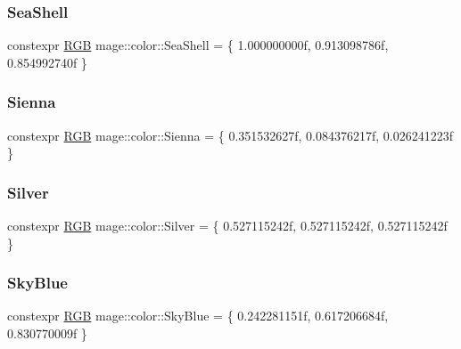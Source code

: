 \mbox{\label{namespacemage_1_1color_aa47be4b4b7553ee872d5593ce4312249}} 
\subsubsection{\texorpdfstring{Sea\+Shell}{SeaShell}}
{\footnotesize\ttfamily constexpr \mbox{\hyperlink{structmage_1_1_r_g_b}{R\+GB}} mage\+::color\+::\+Sea\+Shell = \{ 1.\+000000000f, 0.\+913098786f, 0.\+854992740f \}}

\mbox{\label{namespacemage_1_1color_a5a0af07311915c908bfec906f104ce21}} 
\subsubsection{\texorpdfstring{Sienna}{Sienna}}
{\footnotesize\ttfamily constexpr \mbox{\hyperlink{structmage_1_1_r_g_b}{R\+GB}} mage\+::color\+::\+Sienna = \{ 0.\+351532627f, 0.\+084376217f, 0.\+026241223f \}}

\mbox{\label{namespacemage_1_1color_a3096a544f2ff01351f010eb5f36f27fa}} 
\subsubsection{\texorpdfstring{Silver}{Silver}}
{\footnotesize\ttfamily constexpr \mbox{\hyperlink{structmage_1_1_r_g_b}{R\+GB}} mage\+::color\+::\+Silver = \{ 0.\+527115242f, 0.\+527115242f, 0.\+527115242f \}}

\mbox{\label{namespacemage_1_1color_a339e4398bfd1cb4ac82f65578c9cfd1d}} 
\subsubsection{\texorpdfstring{Sky\+Blue}{SkyBlue}}
{\footnotesize\ttfamily constexpr \mbox{\hyperlink{structmage_1_1_r_g_b}{R\+GB}} mage\+::color\+::\+Sky\+Blue = \{ 0.\+242281151f, 0.\+617206684f, 0.\+830770009f \}}

